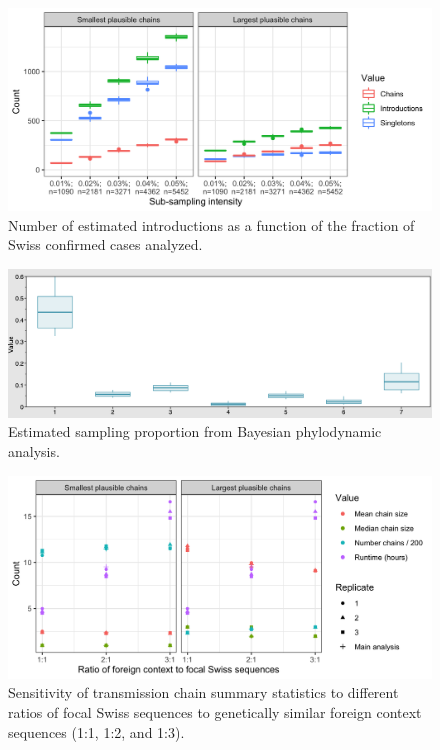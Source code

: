 \documentclass[9pt,twoside,lineno]{pnas-new}
\begin{document}
\begin{figure}
\centering
\includegraphics[width = 11.4cm]{figures/fig_SX_sensitivity_subsampling.png}
\caption{Number of estimated introductions as a function of the fraction of Swiss confirmed cases analyzed.}  
\label{fig:sensitivity_downsampling}
\end{figure}

\begin{figure}
\centering
\includegraphics[width = 11.4cm]{figures/Samp_noSampUB.png}
\caption{Estimated sampling proportion from Bayesian phylodynamic analysis.}  
\label{fig:samp-prop}
\end{figure}

\begin{figure}
\centering
\includegraphics[width = 11.4cm]{figures/fig_SX_sensitivity_context_set_size.png}
\caption{Sensitivity of transmission chain summary statistics to different ratios of focal Swiss sequences to genetically similar foreign context sequences (1:1, 1:2, and 1:3).}  
\label{fig:sensitivity_context_set_size}
\end{figure}
\end{document}
